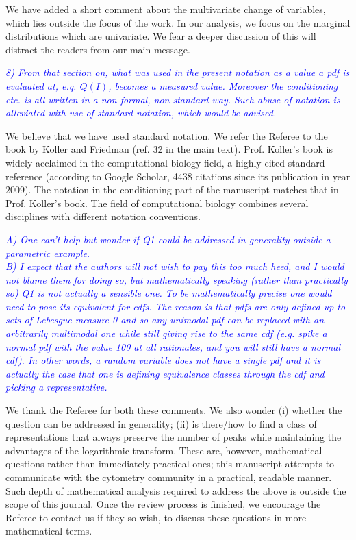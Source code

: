 \documentclass[letter,11pt,draft]{article}
\newcommand{\re}[1]{\emph{\textcolor{blue}{#1}}}
\begin{document}
\smallskip
We have added a short comment about the multivariate change of variables, which lies outside the focus of the work. In our analysis, we focus on the marginal distributions which are univariate. We fear a deeper discussion of this will distract the readers from our main message. 

\re{
8) From that section on, what was used in the present notation as a value a pdf is evaluated at, e.q. $Q(I)$, becomes a measured value.  Moreover the conditioning etc. is all written in a non-formal, non-standard way. Such abuse of notation is alleviated with use of standard notation, which would be advised.}

\smallskip
We believe that we have used standard notation. We refer the Referee to the book by Koller and Friedman (ref. 32 in the main text). Prof. Koller's book is widely acclaimed in the computational biology field, a highly cited standard reference (according to Google Scholar, 4438 citations since its publication in year 2009). The notation in the conditioning part of the manuscript matches that in Prof. Koller's book. The field of computational biology combines several disciplines with different notation conventions. 

\re{
A) One can't help but wonder if Q1 could be addressed in generality outside a parametric example.
\\
B) I expect that the authors will not wish to pay this too much heed, and I would not blame them for doing so, but mathematically speaking (rather than practically so) Q1 is not actually a sensible one. To be mathematically precise one would need to pose its equivalent for cdfs. The reason is that pdfs are only defined up to sets of Lebesgue measure 0 and so any unimodal pdf can be replaced with an arbitrarily multimodal one while still giving rise to the same cdf (e.g. spike a normal pdf with the value 100 at all rationales, and you will still have a normal cdf). In other words, a random variable does not have a single pdf and it is actually the case that one is defining equivalence classes through the cdf and picking a representative.
}

\smallskip
We thank the Referee for both these comments. We also wonder (i) whether the question can be addressed in generality; (ii) is there/how to find a class of representations that always preserve the number of peaks while maintaining the advantages of the logarithmic transform. These are, however, mathematical questions rather than immediately practical ones; this manuscript attempts to communicate with the cytometry community in a practical, readable manner. Such depth of mathematical analysis required to address the above is outside the scope of this journal. Once the review process is finished, we encourage the Referee to contact us if they so wish, to discuss these questions in more mathematical terms.
\end{document}
